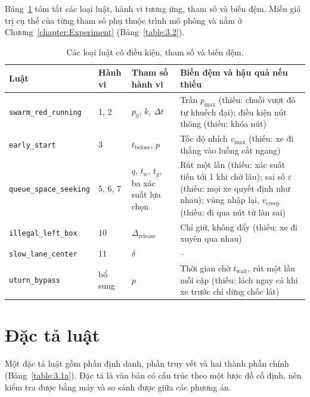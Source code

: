 \documentclass[../main.tex]{subfiles}
\begin{document}
Bảng~\ref{table:rg_mech} tóm tắt các loại luật, hành vi tương ứng, tham số và biến đệm. Miền giá trị cụ thể của từng tham số phụ thuộc trình mô phỏng và nằm ở Chương~\ref{chapter:Experiment} (Bảng~\ref{table:3.2}).

\begin{table}[!htbp]
\centering
\small
\caption{Các loại luật có điều kiện, tham số và biến đệm.}
\label{table:rg_mech}
\begin{tabular}{|p{2.7cm}|p{1.3cm}|p{4.0cm}|p{5.2cm}|}
\hline
\textbf{Luật} & \textbf{Hành vi} & \textbf{Tham số hành vi} & \textbf{Biến đệm và hậu quả nếu thiếu} \\ \hline
\texttt{swarm\_\allowbreak red\_\allowbreak running} & 1, 2 & $p_0$, $k$, $\Delta t$ & Trần $p_{\max}$ (thiếu: chuỗi vượt đỏ tự khuếch đại); điều kiện nút thông (thiếu: khóa nút) \\ \hline
\texttt{early\_\allowbreak start} & 3 & $t_{\text{before}}$, $p$ & Tốc độ nhích $v_{\max}$ (thiếu: xe đi thẳng vào luồng cắt ngang) \\ \hline
\texttt{queue\_\allowbreak space\_\allowbreak seeking} & 5, 6, 7 & $q$, $t_w$, $t_g$, ba xác suất lựa chọn & Rút một lần (thiếu: xác suất tiến tới 1 khi chờ lâu); sai số $\varepsilon$ (thiếu: mọi xe quyết định như nhau); vùng nhập lại, $v_{\text{creep}}$ (thiếu: đi qua nút từ làn sai) \\ \hline
\texttt{illegal\_\allowbreak left\_\allowbreak box} & 10 & $\Delta_{\text{release}}$ & Chỉ giữ, không đẩy (thiếu: xe đi xuyên qua nhau) \\ \hline
\texttt{slow\_\allowbreak lane\_\allowbreak center} & 11 & $\delta$ & -- \\ \hline
\texttt{uturn\_\allowbreak bypass} & bổ sung & $p$ & Thời gian chờ $t_{\text{wait}}$, rút một lần mỗi cặp (thiếu: lách ngay cả khi xe trước chỉ dừng chốc lát) \\ \hline
\end{tabular}
\end{table}

\section{Đặc tả luật}
\label{section:3.3}

Một đặc tả luật gồm phần định danh, phần truy vết và hai thành phần chính (Bảng~\ref{table:3.1a}). Đặc tả là văn bản có cấu trúc theo một lược đồ cố định, nên kiểm tra được bằng máy và so sánh được giữa các phương án.
\end{document}
